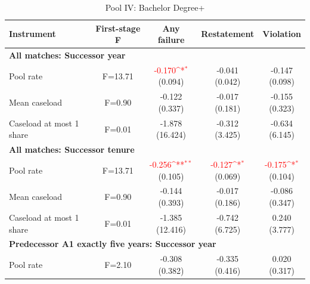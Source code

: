 \begin{table}[htbp]
\footnotesize
\def\sym#1{\ifmmode^{#1}\else\(^{#1}\)\fi}
\centering
\caption{Pool IV: Bachelor Degree+}
\begin{threeparttable}
\begin{tabular}{p{}cccc}
\toprule
Instrument & First-stage F & Any failure & Restatement & Violation \\
\midrule
\multicolumn{5}{l}{\textbf{All matches: Successor year}} \\
Pool rate & F=13.71 & \shortstack{\textcolor{red}{-0.170\sym{*}}\\(0.094)} & \shortstack{-0.041\\(0.042)} & \shortstack{-0.147\\(0.098)} \\
Mean caseload & F=0.90 & \shortstack{-0.122\\(0.337)} & \shortstack{-0.017\\(0.181)} & \shortstack{-0.155\\(0.323)} \\
Caseload at most 1 share & F=0.01 & \shortstack{-1.878\\(16.424)} & \shortstack{-0.312\\(3.425)} & \shortstack{-0.634\\(6.145)} \\
\multicolumn{5}{l}{\textbf{All matches: Successor tenure}} \\
Pool rate & F=13.71 & \shortstack{\textcolor{red}{-0.256\sym{**}}\\(0.105)} & \shortstack{\textcolor{red}{-0.127\sym{*}}\\(0.069)} & \shortstack{\textcolor{red}{-0.175\sym{*}}\\(0.104)} \\
Mean caseload & F=0.90 & \shortstack{-0.144\\(0.393)} & \shortstack{-0.017\\(0.186)} & \shortstack{-0.086\\(0.347)} \\
Caseload at most 1 share & F=0.01 & \shortstack{-1.385\\(12.416)} & \shortstack{-0.742\\(6.725)} & \shortstack{0.240\\(3.777)} \\
\multicolumn{5}{l}{\textbf{Predecessor A1 exactly five years: Successor year}} \\
Pool rate & F=2.10 & \shortstack{-0.308\\(0.382)} & \shortstack{-0.335\\(0.416)} & \shortstack{0.020\\(0.317)} \\

\end{tabular}
\end{threeparttable}
\end{table}
